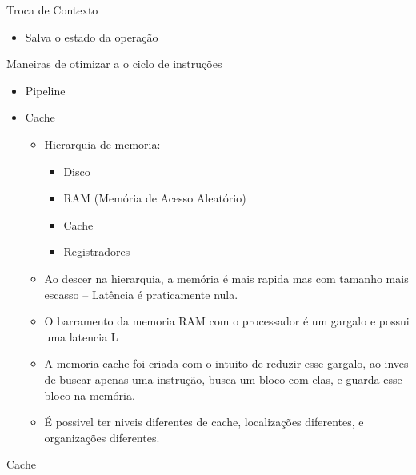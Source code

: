 \documentclass[12pt]{article}
\begin{document}
Troca de Contexto
\begin{itemize}
    \item Salva o estado da operação
\end{itemize}
Maneiras de otimizar a o ciclo de instruções
\begin{itemize}
    \item Pipeline
    \item Cache
    \begin{itemize}
        \item Hierarquia de memoria:
        \begin{itemize}
            \item Disco
            \item RAM (Memória de Acesso Aleatório)
            \item Cache
            \item Registradores
        \end{itemize}
        \item Ao descer na hierarquia, a memória é mais rapida mas com tamanho 
        mais escasso -- Latência é praticamente nula.
        \item O barramento da memoria RAM com o processador é um gargalo e 
        possui uma latencia L
        \item A memoria cache foi criada com o intuito de reduzir esse gargalo, 
        ao inves de buscar apenas uma instrução, busca um bloco com elas, e 
        guarda esse bloco na memória.
        \item É possivel ter niveis diferentes de cache, localizações diferentes, 
        e organizações diferentes.
    \end{itemize}
\end{itemize}
Cache
\end{document}
